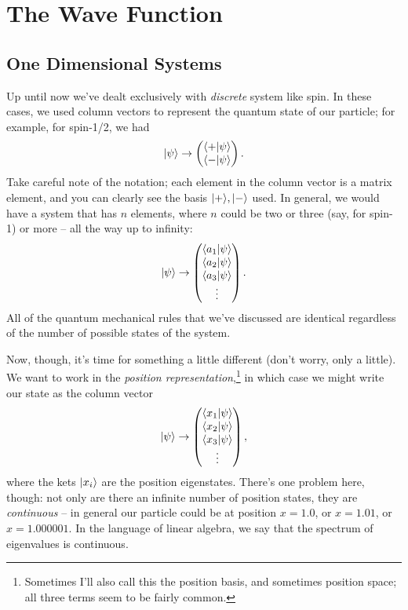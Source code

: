 \chapter{The Wave Function}

\section{One Dimensional Systems}

Up until now we've dealt exclusively with \emph{discrete} system like spin.  In these cases, we used column vectors to represent the quantum state of our particle; for example, for spin-1/2, we had
\[
| \psi \rangle \to \begin{pmatrix} \langle + | \psi \rangle \\ \langle - | \psi \rangle \end{pmatrix}.
\]
Take careful note of the notation; each element in the column vector is a matrix element, and you can clearly see the basis $| + \rangle,| - \rangle$ used.  In general, we would have a system that has $n$ elements, where $n$ could be two or three (say, for spin-1) or more -- all the way up to infinity:
\[
| \psi \rangle \to \begin{pmatrix} \langle a_1 | \psi \rangle \\ \langle a_2 | \psi \rangle \\ \langle a_3 | \psi \rangle \\ \vdots \end{pmatrix}.
\]
All of the quantum mechanical rules that we've discussed are identical regardless of the number of possible states of the system.

Now, though, it's time for something a little different (don't worry, only a little).  We want to work in the \emph{position representation},\footnote{Sometimes I'll also call this the position basis, and sometimes position space; all three terms seem to be fairly common.} in which case we might write our state as the column vector
\begin{equation}
\label{eq_pos_col_vec}
| \psi \rangle \to \begin{pmatrix} \langle x_1 | \psi \rangle \\ \langle x_2 | \psi \rangle \\ \langle x_3 | \psi \rangle \\ \vdots \end{pmatrix},
\end{equation}
where the kets $| x_i \rangle$ are the position eigenstates.  There's one problem here, though: not only are there an infinite number of position states, they are \emph{continuous} -- in general our particle could be at position $x=1.0$, or $x =1.01$, or $x = 1.000001$.  In the language of linear algebra, we say that the spectrum of eigenvalues is continuous.  

